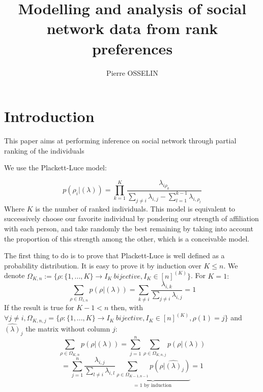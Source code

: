 \documentclass[12pt]{ociamthesis}  %
\title{Modelling and analysis of social network data from rank preferences     %
	}   %
\author{Pierre OSSELIN}             %
\begin{document}
	
	\maketitle                  %
	\tableofcontents
	
	
	\chapter{Introduction}
	
	This paper aims at performing inference on social network through partial ranking of the individuals
	
	We use the Plackett-Luce model: 
	
	\begingroup
	\large
	\begin{equation}
	p(\rho_{i} | (\lambda)) = \prod_{k = 1}^{K}\frac{\lambda_{i\rho_{k}}}{\sum_{j \neq i}\lambda_{i,j} - \sum_{l = 1}^{k - 1}\lambda_{i,\rho_{l}}}
	\end{equation}
	\endgroup
	Where $K$ is the number of ranked individuals. This model is equivalent to successively choose our favorite individual by pondering our strength of affiliation with each person, and take randomly the best remaining by taking into account the proportion of this strength among the other, which is a conceivable model.
	
	The first thing to do is to prove that Plackett-Luce is well defined as a probability distribution. It is easy to prove it by induction over $K \leq n$. \newline
	We denote $\Omega_{K,n} := \{ \rho : \{1,...,K\} \rightarrow I_{K} \ bijective, I_{K} \in [n]^{(K)}  \}$. For $K = 1 :$
	\begingroup
	\large
	\begin{equation}
	\sum_{\rho \in \Omega_{1,n} }p(\rho | (\lambda)) = \sum_{k \neq i}\frac{\lambda_{i,k}}{\sum_{j \neq i}\lambda_{i,j}} = 1
	\end{equation}
	\endgroup
	If the result is true for $K - 1 < n$ then, with \newline 
	$\forall j \neq i, \Omega_{K,n,j} = \{ \rho : \{1,...,K\} \rightarrow I_{K} \ bijective, I_{K} \in [n]^{(K)}, \rho(1) = j\}$ and $\hat{(\lambda)}_{j}$ the matrix without column $j$:
	\begingroup
	\large
	\begin{equation}
	\sum_{\rho \in \Omega_{K,n} }p(\rho | (\lambda)) = \sum_{j = 1}^{n} \sum_{\rho \in \Omega_{K,n,j}}p(\rho | (\lambda))
	\end{equation}
	\endgroup
	\begingroup
	\large
	\begin{equation}
	= \sum_{j = 1}^{n} \frac{\lambda_{i,j}}{\sum_{l \neq i}\lambda_{i,l}} \underbrace{\sum_{\rho \in \Omega_{K-1,n-1}}p(\rho | \hat{(\lambda)}_{j})}_\text{= 1 by induction} = 1
	\end{equation}
	\endgroup
	
\end{document}
